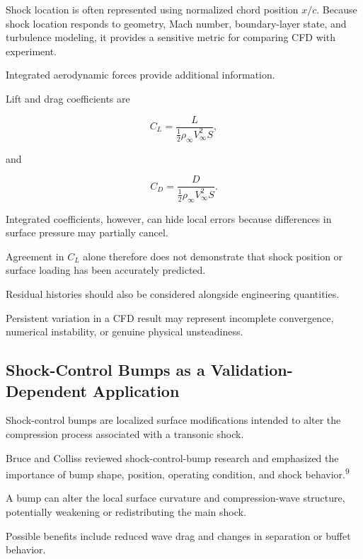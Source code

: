 \documentclass[10pt]{article}
\newcommand{\supercite}[1]{\textsuperscript{#1}}
\begin{document}
Shock location is often represented using normalized chord position
$x/c$. Because shock location responds to geometry, Mach number,
boundary-layer state, and turbulence modeling, it provides a sensitive
metric for comparing CFD with experiment.

Integrated aerodynamic forces provide additional information.

Lift and drag coefficients are

\begin{equation}
C_L=
\frac{L}
{\frac{1}{2}\rho_{\infty}V_{\infty}^{2}S},
\end{equation}

and

\begin{equation}
C_D=
\frac{D}
{\frac{1}{2}\rho_{\infty}V_{\infty}^{2}S}.
\end{equation}

Integrated coefficients, however, can hide local errors because
differences in surface pressure may partially cancel.

Agreement in $C_L$ alone therefore does not demonstrate that shock
position or surface loading has been accurately predicted.

Residual histories should also be considered alongside engineering
quantities.

Persistent variation in a CFD result may represent incomplete
convergence, numerical instability, or genuine physical unsteadiness.


\subsection{Shock-Control Bumps as a Validation-Dependent Application}

Shock-control bumps are localized surface modifications intended to
alter the compression process associated with a transonic shock.

Bruce and Colliss reviewed shock-control-bump research and emphasized
the importance of bump shape, position, operating condition, and shock
behavior.\supercite{9}

A bump can alter the local surface curvature and compression-wave
structure, potentially weakening or redistributing the main shock.

Possible benefits include reduced wave drag and changes in separation
or buffet behavior.
\end{document}
